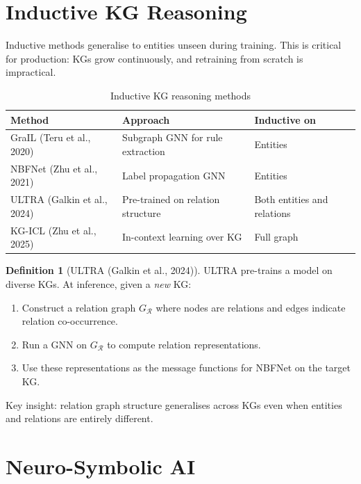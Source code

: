 \documentclass[11pt,a4paper,oneside,openany]{book}
\theoremstyle{definition}
\newtheorem{definition}{Definition}[chapter]
\theoremstyle{plain}
\theoremstyle{remark}
\newcommand{\cR}{\mathcal{R}}
\begin{document}
\section{Inductive KG Reasoning}\label{sec:inductive}

Inductive methods generalise to entities unseen during training. This is critical for production: KGs grow continuously, and retraining from scratch is impractical.

\begin{table}[h]
	\centering
	\caption{Inductive KG reasoning methods}
	\label{tab:inductive}
	\begin{tabular}{lp{5cm}p{5cm}}
		\toprule
		Method                      & Approach                          & Inductive on                \\
		\midrule
		GraIL (Teru et al., 2020)   & Subgraph GNN for rule extraction  & Entities                    \\
		NBFNet (Zhu et al., 2021)   & Label propagation GNN             & Entities                    \\
		ULTRA (Galkin et al., 2024) & Pre-trained on relation structure & Both entities and relations \\
		KG-ICL (Zhu et al., 2025)   & In-context learning over KG       & Full graph                  \\
		\bottomrule
	\end{tabular}
\end{table}

\begin{definition}[ULTRA (Galkin et al., 2024)]
	ULTRA pre-trains a model on diverse KGs. At inference, given a \emph{new} KG:
	\begin{enumerate}
		\item Construct a relation graph $G_{\cR}$ where nodes are relations and edges indicate relation co-occurrence.
		\item Run a GNN on $G_{\cR}$ to compute relation representations.
		\item Use these representations as the message functions for NBFNet on the target KG.
	\end{enumerate}
	Key insight: relation graph structure generalises across KGs even when entities and relations are entirely different.
\end{definition}

\section{Neuro-Symbolic AI}\label{sec:neuro-symbolic}
\end{document}
